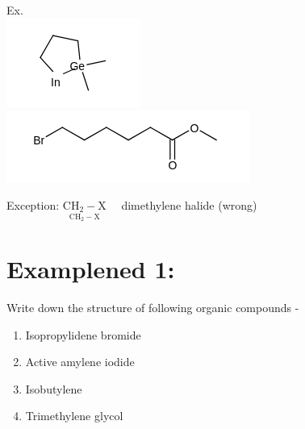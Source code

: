\documentclass[10pt]{article}
\begin{document}
Ex.\\
\includegraphics{smile-5af8ad478ed7834f43e8a1fc891449c2e421ec03}\\
\includegraphics{smile-523c328527d901e9cf6ad3418776e0f172d8cd6a}

Exception: $\underset{\mathrm{CH}_{2}-\mathrm{X}}{\mathrm{CH}_{2}-\mathrm{X}} \quad$ dimethylene halide (wrong)

\section*{Examplened 1:}
Write down the structure of following organic compounds -

\begin{enumerate}
  \item Isopropylidene bromide
  \item Active amylene iodide
  \item Isobutylene
  \item Trimethylene glycol
\end{enumerate}
\end{document}
